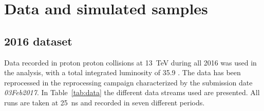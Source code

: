 \section{Data and simulated samples}\label{sec:Dataset}

\subsection{2016 dataset}
Data recorded in proton proton collisions at 13~TeV during all 2016 was used in the analysis, with a total integrated luminosity of  35.9 \fbinv.
The data has been reprocessed in the reprocessing campaign characterized by the submission date \textit{03Feb2017}.
In Table~\ref{tab:data} the different data streams used are presented. All
runs are taken at 25~ns and recorded in seven different periods.
%

